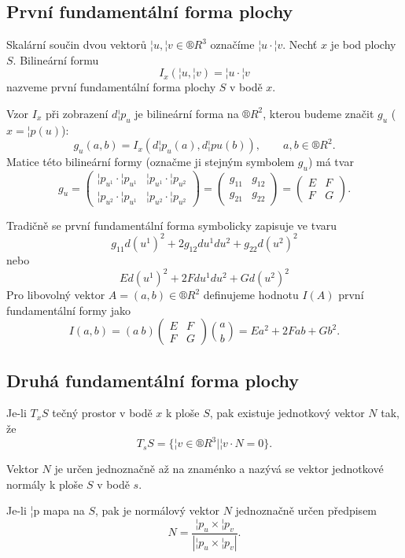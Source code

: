 \documentclass[12pt]{article}                   %
\begin{document}
    \subsection{První fundamentální forma plochy}
        \begin{definice}
            Skalární součin dvou vektorů $¦u, ¦v \in ®R^3$ označíme $¦u·¦v$. Nechť $x$ je bod plochy $S$. Bilineární formu
            $$ I_x(¦u, ¦v) = ¦u·¦v $$
            nazveme první fundamentální forma plochy $S$ v bodě $x$.

            Vzor $I_x$ při zobrazení $d¦p_u$ je bilineární forma na $®R^2$, kterou budeme značit $g_u$ ($x=¦p(u)$):
            $$ g_u(a, b) = I_x(d¦p_u(a), d¦pu(b)), \qquad a, b \in ®R^2. $$
            Matice této bilineární formy (označme ji stejným symbolem $g_u$) má tvar
            $$ g_u = \begin{pmatrix} ¦p_{u^1}·¦p_{u^1} & ¦p_{u^1}·¦p_{u^2} \\ ¦p_{u^2}·¦p_{u^1} & ¦p_{u^2}·¦p_{u^2} \end{pmatrix} = \begin{pmatrix} g_{11} & g_{12} \\ g_{21} & g_{22} \end{pmatrix} = \begin{pmatrix} E & F \\ F & G \end{pmatrix}. $$

            Tradičně se první fundamentální forma symbolicky zapisuje ve tvaru
            $$ g_{11}d(u^1)^2 + 2g_{12}du^1du^2 + g_{22}d(u^2)^2 $$ 
            nebo
            $$ Ed(u^1)^2 + 2Fdu^1du^2 + Gd(u^2)^2 $$
            Pro libovolný vektor $A = (a, b) \in ®R^2$ definujeme hodnotu $I(A)$ první fundamentální formy jako
            $$ I(a, b) = (a\ b)\begin{pmatrix} E & F \\ F & G \end{pmatrix} \binom{a}{b} = Ea^2 + 2Fab + Gb^2. $$ 
        \end{definice}

    \subsection{Druhá fundamentální forma plochy}
        \begin{definice}[Normála]
            Je-li $T_xS$ tečný prostor v bodě $x$ k ploše $S$, pak existuje jednotkový vektor $N$ tak, že
            $$ T_sS = \{¦v \in ®R^3 | ¦v·N = 0\}. $$

            Vektor $N$ je určen jednoznačně až na znaménko a nazývá se vektor jednotkové normály k ploše $S$ v bodě $s$.

            Je-li ¦p mapa na $S$, pak je normálový vektor $N$ jednoznačně určen předpisem
            $$ N = \frac{¦p_u \times ¦p_v}{|¦p_u \times ¦p_v|}. $$ 
        \end{definice}
\end{document}
